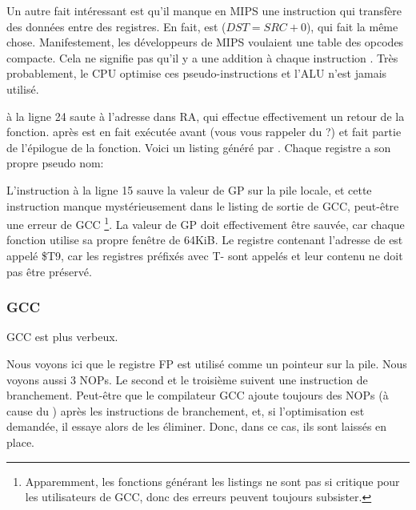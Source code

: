 Un autre fait intéressant est qu'il manque en MIPS une instruction qui transfère
des données entre des registres.
En fait,   est  ($DST=SRC+0$), qui
fait la même chose.
Manifestement, les développeurs de MIPS voulaient une table des opcodes compacte.
Cela ne signifie pas qu'il y a une addition à chaque instruction .
Très probablement, le \ac{CPU} optimise ces pseudo-instructions et l'\ac{ALU} n'est
jamais utilisé.


 à la ligne 24 saute à l'adresse dans \ac{RA}, qui effectue effectivement
un retour de la fonction.
 après  est en fait exécutée avant  (vous vous rappeler
du ?) et fait partie de l'épilogue de la fonction.
Voici un listing généré par \IDA. Chaque registre a son propre pseudo nom:



L'instruction à la ligne 15 sauve la valeur de GP sur la pile locale, et cette
instruction manque mystérieusement dans le listing de sortie de GCC, peut-être
une erreur de GCC
\footnote{Apparemment, les fonctions générant les listings ne sont pas si critique
pour les utilisateurs de GCC, donc des erreurs peuvent toujours subsister.}.
La valeur de GP doit effectivement être sauvée, car chaque fonction utilise sa
propre fenêtre de 64KiB.
Le registre contenant l'adresse de \puts est appelé \$T9, car les registres
préfixés avec T- sont appelés  et leur contenu ne doit pas être
préservé. 

\subsubsection{GCC \NonOptimizing}

GCC \NonOptimizing est plus verbeux.



Nous voyons ici que le registre FP est utilisé comme un pointeur sur la pile.
Nous voyons aussi 3 \ac{NOP}s.
Le second et le troisième suivent une instruction de branchement.
Peut-être que le compilateur GCC ajoute toujours des \ac{NOP}s (à cause du
) après les instructions de branchement, et,
si l'optimisation est demandée, il essaye alors de les éliminer.
Donc, dans ce cas, ils sont laissés en place.

